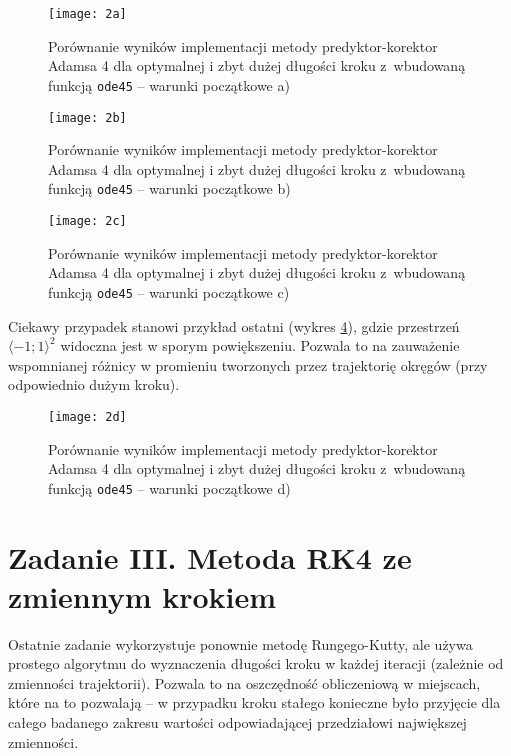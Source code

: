 \documentclass[12pt]{article}
\begin{document}
\begin{figure}[!htbp]
\centering
\texttt{[image: 2a]}
\centering
\caption{Porównanie wyników implementacji metody predyktor-korektor Adamsa 4 dla optymalnej i zbyt dużej długości kroku z~wbudowaną funkcją \texttt{ode45} -- warunki początkowe a)}
\label{fig:2a}
\end{figure}
\FloatBarrier

\begin{figure}[!htbp]
\centering
\texttt{[image: 2b]}
\centering
\caption{Porównanie wyników implementacji metody predyktor-korektor Adamsa 4 dla optymalnej i zbyt dużej długości kroku z~wbudowaną funkcją \texttt{ode45} -- warunki początkowe b)}
\label{fig:2b}
\end{figure}
\FloatBarrier

\begin{figure}[!htbp]
\centering
\texttt{[image: 2c]}
\centering
\caption{Porównanie wyników implementacji metody predyktor-korektor Adamsa 4 dla optymalnej i zbyt dużej długości kroku z~wbudowaną funkcją \texttt{ode45} -- warunki początkowe c)}
\label{fig:2c}
\end{figure}
\FloatBarrier

Ciekawy przypadek stanowi przykład ostatni (wykres \ref{fig:2d}), gdzie przestrzeń \( \langle-1; 1\rangle^2 \) widoczna jest w sporym powiększeniu. Pozwala to na zauważenie wspomnianej różnicy w promieniu tworzonych przez trajektorię okręgów (przy odpowiednio dużym kroku).

\begin{figure}[!htbp]
\centering
\texttt{[image: 2d]}
\centering
\caption{Porównanie wyników implementacji metody predyktor-korektor Adamsa 4 dla optymalnej i zbyt dużej długości kroku z~wbudowaną funkcją \texttt{ode45} -- warunki początkowe d)}
\label{fig:2d}
\end{figure}
\FloatBarrier

\section{Zadanie \textrm{III}. Metoda RK4 ze zmiennym krokiem}
Ostatnie zadanie wykorzystuje ponownie metodę Rungego-Kutty, ale używa prostego algorytmu do wyznaczenia długości kroku w każdej iteracji (zależnie od zmienności trajektorii). Pozwala to na oszczędność obliczeniową w miejscach, które na to pozwalają -- w przypadku kroku stałego konieczne było przyjęcie dla całego badanego zakresu wartości odpowiadającej przedziałowi największej zmienności.
\end{document}
